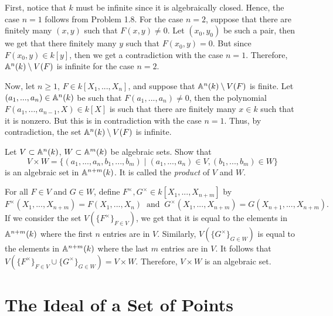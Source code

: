 \begin{solution}
    First, notice that $k$ must be infinite since it is algebraically closed. Hence, the case $n = 1$ follows from Problem 1.8. For the case $n = 2$, suppose that there are finitely many $(x,y)$ such that $F(x,y) \neq 0$. Let $(x_0, y_0)$ be such a pair, then we get that there finitely many $y$ such that $F(x_0, y) = 0$. But since $F(x_0, y) \in k[y]$, then we get a contradiction with the case $n = 1$. Therefore, $\mathbb{A}^n(k) \setminus V(F)$ is infinite for the case $n = 2$.
    
    Now, let $n \geq 1$, $F \in k[X_1, ..., X_n]$, and suppose that $\mathbb{A}^n(k) \setminus V(F)$ is finite. Let $(a_1, ..., a_n) \in \mathbb{A}^n(k)$ be such that $F(a_1, ..., a_n) \neq 0$, then the polynomial $F(a_1, ..., a_{n-1}, X) \in k[X]$ is such that there are finitely many $x \in k$ such that it is nonzero. But this is in contradiction with the case $n = 1$. Thus, by contradiction, the set $\mathbb{A}^n(k) \setminus V(F)$ is infinite. \\
\end{solution}

\begin{exercise}
    Let $V \subset \mathbb{A}^n(k)$, $W \subset \mathbb{A}^m(k)$ be algebraic sets. Show that
    $$V \times W = \{(a_1, ..., a_n, b_1, ..., b_m) \mid (a_1, ..., a_n) \in V, (b_1, ..., b_m) \in W\}$$
    is an algebraic set in $\mathbb{A}^{n+m}(k)$. It is called the \textit{product} of $V$ and $W$.\\
\end{exercise}

\begin{solution}
    For all $F \in V$ and $G \in W$, define $F^{\times}, G^{\times} \in k[X_1, ..., X_{n+m}]$ by
    $$F^{\times}(X_1, ..., X_{n+m}) = F(X_1, ..., X_n) \ \text{ and } \ G^{\times}(X_1, ..., X_{n+m}) = G(X_{n+1}, ..., X_{n+m}).$$
    If we consider the set $V(\{F^{\times}\}_{F \in V})$, we get that it is equal to the elements in $\mathbb{A}^{n+m}(k)$ where the first $n$ entries are in $V$. Similarly, $V(\{G^{\times}\}_{G \in W})$ is equal to the elements in $\mathbb{A}^{n+m}(k)$ where the last $m$ entries are in $V$. It follows that $V(\{F^{\times}\}_{F \in V} \cup \{G^{\times}\}_{G \in W}) = V \times W$. Therefore, $V \times W$ is an algebraic set. 
\end{solution}

\section{The Ideal of a Set of Points}

